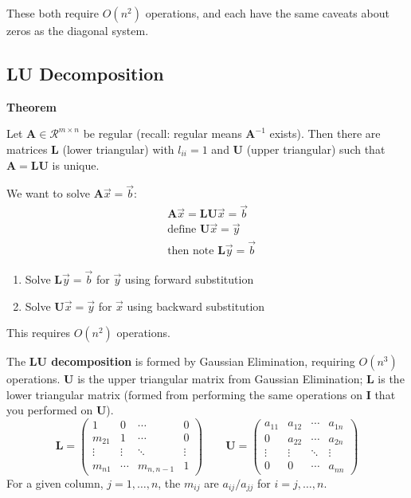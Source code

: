 \documentclass[12pt]{article}
\newcommand{\ve}[1]{\ensuremath{\mathbf{#1}}}
\begin{document}
These both require $O(n^2)$ operations, and each have the same caveats about zeros as the diagonal system.

\subsection{LU Decomposition}

\textbf{Theorem}

Let $\ve{A} \in \mathcal{R}^{m \times n}$ be regular (recall: regular means $\ve{A}^{-1}$ exists). Then there are matrices $\ve{L}$ (lower triangular) with $l_{ii} = 1$ and $\ve{U}$ (upper triangular) such that $\ve{A} = \ve{L}\ve{U}$ is unique.

We want to solve $\ve{A}\vec{x} = \vec{b}$:
%
\begin{align}
&\ve{A}\vec{x} = \ve{L}\ve{U}\vec{x} = \vec{b} \nonumber \\
%
&\text{define } \ve{U}\vec{x} = \vec{y} \nonumber \\
%
&\text{then note }\ve{L}\vec{y} = \vec{b} \nonumber
\end{align}
%
\begin{enumerate}
\item Solve $\ve{L}\vec{y} = \vec{b}$ for $\vec{y}$ using forward substitution
\item Solve $\ve{U}\vec{x} = \vec{y}$ for $\vec{x}$ using backward substitution
\end{enumerate}
%
This requires $O(n^2)$ operations.

The \textbf{LU decomposition} is formed by Gaussian Elimination, requiring $O(n^3)$ operations. $\ve{U}$ is the upper triangular matrix from Gaussian Elimination; $\ve{L}$ is the lower triangular matrix (formed from performing the same operations on $\ve{I}$ that you performed on $\ve{U}$). 
%
\begin{equation}
   \ve{L} = \begin{pmatrix}
      1      & 0      & \cdots    & 0 \\
      m_{21} & 1      & \cdots    & 0 \\
      \vdots & \vdots & \ddots    & \vdots \\     
      m_{n1} & \cdots & m_{n,n-1} & 1 
    \end{pmatrix} \qquad
  \ve{U} = \begin{pmatrix}
      a_{11} & a_{12} & \cdots & a_{1n} \\
      0      & a_{22} & \cdots & a_{2n} \\
      \vdots & \vdots & \ddots & \vdots \\     
      0      & 0      & \cdots &  a_{nn} 
    \end{pmatrix}
    \nonumber   
\end{equation} 
%
For a given column, $j = 1, \dots, n$, the $m_{ij}$ are $a_{ij} / a_{jj}$ for $i = j, \dots, n$. 
\end{document}
